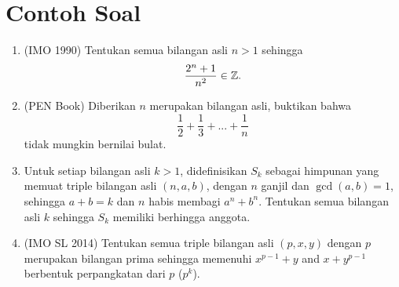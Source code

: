 \documentclass[12pt]{scrartcl}
\begin{document}
\section{Contoh Soal}
\begin{enumerate}
\item (IMO 1990) Tentukan semua bilangan asli $n > 1$ sehingga 
    \begin{align*}
        \dfrac{2^n+1}{n^2} \in \mathbb Z.
    \end{align*}
\item (PEN Book) Diberikan $n$ merupakan bilangan asli, buktikan bahwa
\[\frac{1}{2} + \frac{1}{3} +...+ \frac{1}{n}\]
tidak mungkin bernilai bulat.

\item Untuk setiap bilangan asli $k>1$, didefinisikan $S_k$ sebagai himpunan yang memuat triple bilangan asli $(n,a,b)$, dengan $n$ ganjil dan $\gcd (a,b)=1$, sehingga $a+b=k$ dan $n$ habis membagi $a^n+b^n$. Tentukan semua bilangan asli $k$ sehingga $S_k$ memiliki berhingga anggota.

\item (IMO SL 2014) Tentukan semua triple bilangan asli $(p, x, y)$ dengan $p$ merupakan bilangan prima sehingga memenuhi $x^{p -1} + y$ and $x + y^ {p -1}$ berbentuk perpangkatan dari $p$ ($p^k$). 
\end{enumerate}
\end{document}
